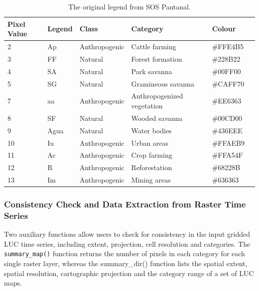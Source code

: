 \begin{table}[htbp]
\centering
\caption{The original legend from SOS Pantanal.}
\label{tab:legend_table}
\begin{tabular}[t]{llllll}
\hline
Pixel Value & Legend & Class      & Category                    & Colour \\
\hline
2        & Ap     & Anthropogenic & Cattle farming              & \#FFE4B5 \\
3        & FF     & Natural       & Forest  formation           & \#228B22 \\
4        & SA     & Natural       & Park savanna                & \#00FF00 \\
5        & SG     & Natural       & Gramineous savanna          & \#CAFF70 \\
7        & aa     & Anthropogenic & Anthropogenized vegetation  & \#EE6363 \\
8        & SF     & Natural       & Wooded savanna              & \#00CD00 \\
9        & Agua   & Natural       & Water bodies                & \#436EEE \\
10       & Iu     & Anthropogenic & Urban areas                 & \#FFAEB9 \\
11       & Ac     & Anthropogenic & Crop farming                & \#FFA54F \\
12       & R      & Anthropogenic & Reforestation               & \#68228B \\
13       & Im     & Anthropogenic & Mining areas                & \#636363 \\
\hline
\end{tabular}
\end{table}

\hypertarget{consistency-check-and-data-extraction-from-raster-time-series}{%
\subsubsection{Consistency Check and Data Extraction from Raster Time
Series}\label{consistency-check-and-data-extraction-from-raster-time-series}}

Two auxiliary functions allow users to check for consistency in the
input gridded LUC time series, including extent, projection, cell
resolution and categories. The \texttt{summary\_map()} function returns
the number of pixels in each category for each single raster layer,
whereas the summary\_dir() function lists the spatial extent, spatial
resolution, cartographic projection and the category range of a set of
LUC maps.

